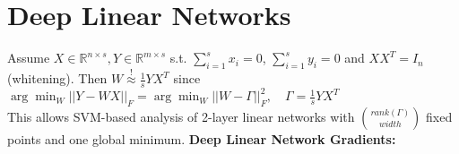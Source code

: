 \color{black}
\section*{Deep Linear Networks}
Assume $X \in \mathbb{R}^{n \times s}, Y\in \mathbb{R}^{m \times s}$ s.t. $\sum_{i=1}^s x_i = 0$, $\sum_{i=1}^s y_i = 0$ and $XX^T = I_n$ (whitening).
Then $W \overset{!}{\approx} \frac{1}{s} Y X^T$ since
\\$\arg\min_W ||Y - W X||_F = \arg\min_W ||W - \Gamma||_F^2,\quad \Gamma = \frac{1}{s}YX^T$ \\
This allows SVM-based analysis of 2-layer linear networks with \(\binom{rank(\Gamma)}{width}\) fixed points and one global minimum.
\textbf{Deep Linear Network Gradients:}\\
 \\